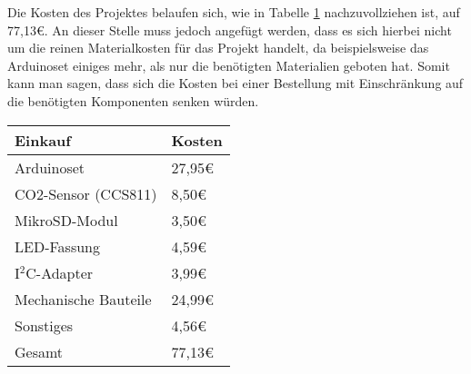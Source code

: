 \label{KostenundArbeitsplan}

Die Kosten des Projektes belaufen sich, wie in Tabelle \ref{tab:Kosten} nachzuvollziehen ist, auf 77,13€. An dieser Stelle muss jedoch angefügt werden, dass es sich hierbei nicht um die reinen Materialkosten für das Projekt handelt, da beispielsweise das Arduinoset einiges mehr, als nur die benötigten Materialien geboten hat. Somit kann man sagen, dass sich die Kosten bei einer Bestellung mit Einschränkung auf die benötigten Komponenten senken würden. \\

\begin{table}[!hbt]
	
	\centering
	
	\begin{tabular}{|p{8cm}|p{8cm}|}
		
		\hline
		\rowcolor{lightgray} Einkauf & Kosten \\
		\hline
		Arduinoset & 27,95€ \\
		\hline
		CO2-Sensor (CCS811) & 8,50€ \\
		\hline
		MikroSD-Modul & 3,50€ \\
		\hline
		\ac{LED}-Fassung & 4,59€ \\
		\hline
		I$^2$C-Adapter & 3,99€ \\
		\hline
		Mechanische Bauteile & 24,99€ \\
		\hline
		Sonstiges & 4,56€ \\
		\hline
		\rowcolor{lightgray} Gesamt & 77,13€ \\
		\hline
		
	\end{tabular}
	
	\label{tab:Kosten}
	
\end{table}
